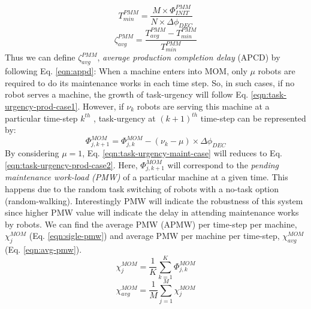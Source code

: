 %
\begin{equation}
T_{min}^{PMM} = \frac{M \times \Phi_{INIT}^{PMM}}{N \times \Delta \phi_{DEC}} 
\label{eqn:min-pmm}
\end{equation}
\begin{equation}
\zeta_{avg}^{PMM} = \frac{T_{avg}^{PMM} - T_{min}^{PMM}}{T_{min}^{PMM}} 
\label{eqn:appd}
\end{equation}
Thus we can define $\zeta_{avg}^{PMM}$, {\em average production completion delay} (APCD) by following Eq. \ref{eqn:appd}:
When a machine enters into MOM, only $\mu$ robots are required to do its maintenance works in each time step. So, in such cases, if no robot serves a machine, the growth of task-urgency will follow Eq. \ref{eqn:task-urgency-prod-case1}. However, if $\nu_{k}$ robots are serving this machine at a particular time-step $k^{th}$ , task-urgency at $(k+1)^{th}$ time-step can be represented by:
\begin{equation}
\Phi_{j, k+1}^{MOM} = \Phi_{j, k}^{MOM}- (\nu_{k} - \mu) \times \Delta \phi_{DEC}
\label{eqn:task-urgency-maint-case}
\end{equation}
By considering $\mu = 1$, Eq. \ref{eqn:task-urgency-maint-case} will reduces to Eq. \ref{eqn:task-urgency-prod-case2}. Here, $\Phi_{j, k+1}^{MOM}$ will correspond to the {\em pending maintenance work-load (PMW)} of a particular machine at a given time. This happens due to the random task switching of robots with a no-task option (random-walking). Interestingly PMW will indicate the robustness of this system since higher PMW value will indicate the delay in attending maintenance works by robots. We can find the average PMW (APMW) per time-step per machine, $\chi_{j}^{MOM}$ (Eq. \ref{eqn:sigle-pmw}) and average PMW per machine per time-step, $\chi_{avg}^{MOM}$ (Eq. \ref{eqn:avg-pmw}).
\begin{equation}
\chi_{j}^{MOM}= \frac{1}{K} \sum_{k=1}^{K} \Phi_{j, k}^{MOM}
\label{eqn:sigle-pmw}
\end{equation}
\begin{equation}
\chi_{avg}^{MOM}= \frac{1}{M} \sum_{j=1}^{M} {\chi_{j}^{MOM}}
\label{eqn:avg-pmw}
\end{equation}
